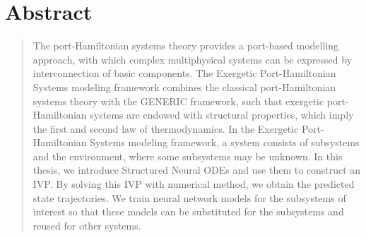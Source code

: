 \chapter*{Abstract}
\begin{quote}

The port-Hamiltonian systems theory provides a port-based modelling approach, with which complex multiphysical systems can be expressed by interconnection of basic components.  The Exergetic Port-Hamiltonian Systems modeling framework combines the classical port-Hamiltonian systems theory with the GENERIC framework, such that exergetic port-Hamiltonian systems are endowed with structural properties, which imply the first and second law of thermodynamics. In the Exergetic Port-Hamiltonian Systems modeling framework, a system consists of subsystems and the environment, where some subsystems may be unknown. In this thesis, we introduce Structured Neural ODEs and use them to construct an IVP. By solving this IVP with numerical method, we obtain the predicted state trajectories. We train neural network models for the subsystems of interest so that these models can be substituted for the subsystems and reused for other systems.

\end{quote}